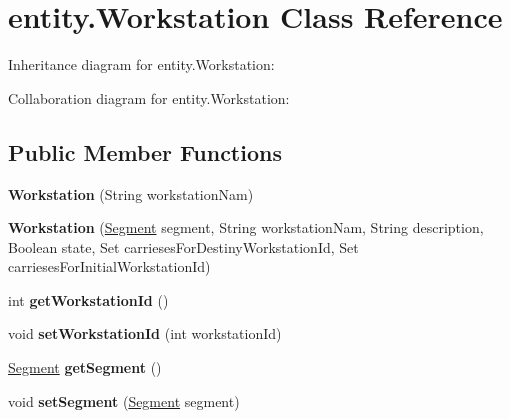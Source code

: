 \hypertarget{classentity_1_1_workstation}{}\section{entity.\+Workstation Class Reference}
\label{classentity_1_1_workstation}


Inheritance diagram for entity.\+Workstation\+:


Collaboration diagram for entity.\+Workstation\+:
\subsection*{Public Member Functions}
\begin{DoxyCompactItemize}
\item 
\mbox{\label{classentity_1_1_workstation_a377e0a2bbe7044cc7f486bae0ea8ed67}} 
{\bfseries Workstation} (String workstation\+Nam)
\item 
\mbox{\label{classentity_1_1_workstation_a22288e3495ba499b6bde23eb07f7101b}} 
{\bfseries Workstation} (\mbox{\hyperlink{classentity_1_1_segment}{Segment}} segment, String workstation\+Nam, String description, Boolean state, Set carrieses\+For\+Destiny\+Workstation\+Id, Set carrieses\+For\+Initial\+Workstation\+Id)
\item 
\mbox{\label{classentity_1_1_workstation_abb73425f42c9c651fdd58e06e9dd5e8b}} 
int {\bfseries get\+Workstation\+Id} ()
\item 
\mbox{\label{classentity_1_1_workstation_a34dbc056f3a0bfa3a94aebfc8a0f0d68}} 
void {\bfseries set\+Workstation\+Id} (int workstation\+Id)
\item 
\mbox{\label{classentity_1_1_workstation_a41f03757564ca8adcdc0a062c33f99d4}} 
\mbox{\hyperlink{classentity_1_1_segment}{Segment}} {\bfseries get\+Segment} ()
\item 
\mbox{\label{classentity_1_1_workstation_a419f3d517914ff99b9c3b1a151deaf37}} 
void {\bfseries set\+Segment} (\mbox{\hyperlink{classentity_1_1_segment}{Segment}} segment)
\item 

\end{DoxyCompactItemize}
